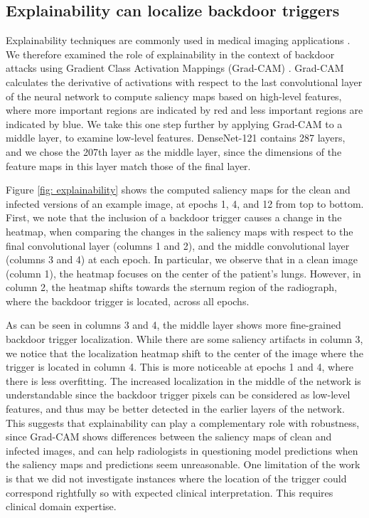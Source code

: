 \documentclass[letterpaper]{article} %
\begin{document}
\subsection{Explainability can localize backdoor triggers}


Explainability techniques are commonly used in medical imaging applications \cite{holzinger2019causability}. We therefore examined the role of explainability in the context of backdoor attacks using Gradient Class Activation Mappings (Grad-CAM) \cite{selvaraju2017grad}. Grad-CAM calculates the derivative of activations with respect to the last convolutional layer of the neural network to compute saliency maps based on high-level features, where more important regions are indicated by red and less important regions are indicated by blue. We take this one step further by applying Grad-CAM to a middle layer, to examine low-level features. DenseNet-121 contains 287 layers, and we chose the 207th layer as the middle layer, since the  dimensions of the feature maps in this layer match those of the final layer.

Figure \ref{fig: explainability} shows the computed saliency maps for the clean and infected versions of an example image, at epochs 1, 4, and 12 from top to bottom. First, we note that the inclusion of a backdoor trigger causes a change in the heatmap, when comparing the changes in the saliency maps with respect to the final convolutional layer (columns 1 and 2), and the middle convolutional layer (columns 3 and 4) at each epoch. In particular, we observe that in a clean image (column 1), the heatmap focuses on the center of the patient's lungs. However, in column 2, the heatmap shifts towards the sternum region of the radiograph, where the backdoor trigger is located, across all epochs.

 As can be seen in columns 3 and 4, the middle layer shows more fine-grained backdoor trigger localization. While there are some saliency artifacts in column 3, we notice that the localization heatmap shift to the center of the image where the trigger is located in column 4. This is more noticeable at epochs 1 and 4, where there is less overfitting. The increased localization in the middle of the network is understandable since the backdoor trigger pixels can be considered as low-level features, and thus may be better detected in the earlier layers of the network. This suggests that explainability can play a complementary role with robustness, since Grad-CAM shows differences between the saliency maps of clean and infected images, and can help radiologists in questioning model predictions when the saliency maps and predictions seem unreasonable. One limitation of the work is that we did not investigate instances where the location of the trigger could correspond rightfully so with expected clinical interpretation. This requires clinical domain expertise. 
  
\end{document}

